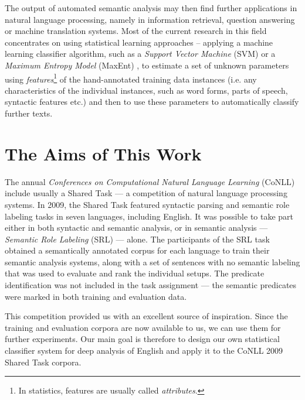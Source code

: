 \documentclass[12pt,notitlepage]{report}
\begin{document}
The output of automated semantic analysis may then find further applications in natural language processing, namely in information retrieval, question answering or machine translation systems. Most of the current research in this field concentrates on using statistical learning approaches -- applying a machine learning classifier algorithm, such as a \emph{Support Vector Machine} (SVM) \citep{boser92} or a \emph{Maximum Entropy Model} (MaxEnt) \citep{jelinek97}, to estimate a set of unknown parameters using \emph{features}\footnote{In statistics, features are usually called \emph{attributes}.} of the hand-annotated training data instances (i.e. any characteristics of the individual instances, such as word forms, parts of speech, syntactic features etc.) and then to use these parameters to automatically classify further texts.

\section{The Aims of This Work}\label{aims}

The annual \emph{Conferences on Computational Natural Language Learning} (CoNLL) include usually a Shared Task --- a competition of natural language processing systems. In 2009, the Shared Task \citep{hajic09} featured syntactic parsing and semantic role labeling tasks in seven languages, including English. It was possible to take part either in both syntactic and semantic analysis, or in semantic analysis --- \emph{Semantic Role Labeling} (SRL) --- alone. The participants of the SRL task obtained a semantically annotated corpus for each language to train their semantic analysis systems, along with a set of sentences with no semantic labeling that was used to evaluate and rank the individual setups. The predicate identification was not included in the task assignment --- the semantic predicates were marked in both training and evaluation data.

This competition provided us with an excellent source of inspiration. Since the training and evaluation corpora are now available to us, we can use them for further experiments. Our main goal is therefore to design our own statistical classifier system for deep analysis of English and apply it to the CoNLL 2009 Shared Task corpora. 
\end{document}
